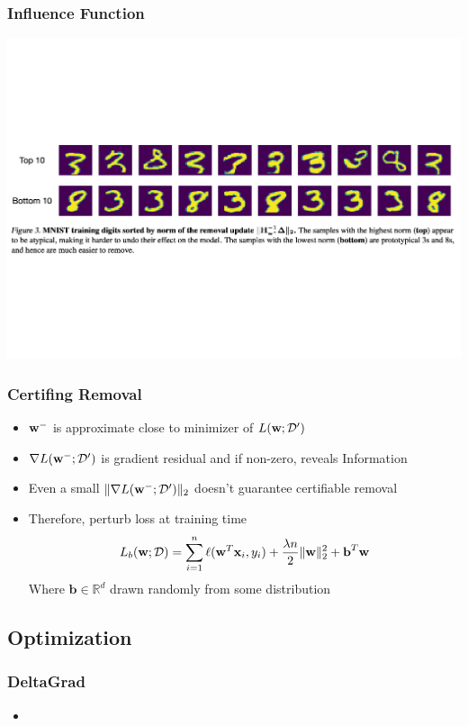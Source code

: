\documentclass[pdf]{beamer}
\begin{document}
\begin{frame}
  \frametitle{Influence Function}
  \includegraphics[width=\textwidth]{images/influence functions.pdf}
\end{frame}

\begin{frame}
  \frametitle{Certifing Removal}
  \begin{itemize}
    \item $\textbf{w}^{-}$ is approximate close to minimizer of $L(\textbf{w};\mathcal{D}^{\prime})$
    \item $\nabla L(\textbf{w}^{-};\mathcal{D}^{\prime})$ is gradient residual and if non-zero, reveals Information
    \item Even a small $\|\nabla L(\textbf{w}^{-};\mathcal{D}^{\prime})\|_{2}$ doesn't guarantee certifiable removal 
    \item Therefore, perturb loss at training time 
    \[
      L_{b}(\textbf{w};\mathcal{D}) = \sum_{i=1}^{n}\ell(\textbf{w}^{T}\textbf{x}_{i},y_{i})+\frac{\lambda n}{2}\|\textbf{w}\|_{2}^{2} + \textbf{b}^{T}\textbf{w}
    \]
    Where $\textbf{b}\in \mathbb{R}^{d}$ drawn randomly from some distribution
  \end{itemize}

\end{frame}

\subsection{Optimization}
\begin{frame}
  \myNset[2]
  \smartart
\end{frame}

\begin{frame}
  \frametitle{
    DeltaGrad \cite{wuDeltaGradRapidRetraining2020}
    }
  \begin{itemize}
    \item 
  \end{itemize}
\end{frame}
\end{document}
